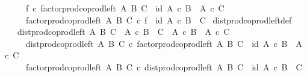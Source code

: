 \begin{isabellebody}
\ \ \ \ {\isasymand}\ f\ {\isasymcirc}\isactrlsub c\ factor{\isacharunderscore}{\kern0pt}prod{\isacharunderscore}{\kern0pt}coprod{\isacharunderscore}{\kern0pt}left\ A\ B\ C\ {\isacharequal}{\kern0pt}\ id\ {\isacharparenleft}{\kern0pt}{\isacharparenleft}{\kern0pt}A\ {\isasymtimes}\isactrlsub c\ B{\isacharparenright}{\kern0pt}\ {\isasymCoprod}\ {\isacharparenleft}{\kern0pt}A\ {\isasymtimes}\isactrlsub c\ C{\isacharparenright}{\kern0pt}{\isacharparenright}{\kern0pt}\isanewline
\ \ \ \ {\isasymand}\ factor{\isacharunderscore}{\kern0pt}prod{\isacharunderscore}{\kern0pt}coprod{\isacharunderscore}{\kern0pt}left\ A\ B\ C\ {\isasymcirc}\isactrlsub c\ f\ {\isacharequal}{\kern0pt}\ id\ {\isacharparenleft}{\kern0pt}A\ {\isasymtimes}\isactrlsub c\ {\isacharparenleft}{\kern0pt}B\ {\isasymCoprod}\ C{\isacharparenright}{\kern0pt}{\isacharparenright}{\kern0pt}{\isacharparenright}{\kern0pt}{\isachardoublequoteclose}\isanewline
\isanewline
{}\isamarkupfalse%
\ dist{\isacharunderscore}{\kern0pt}prod{\isacharunderscore}{\kern0pt}coprod{\isacharunderscore}{\kern0pt}left{\isacharunderscore}{\kern0pt}def{}{\isacharcolon}{\kern0pt}\isanewline
\ \ \ {\isachardoublequoteopen}dist{\isacharunderscore}{\kern0pt}prod{\isacharunderscore}{\kern0pt}coprod{\isacharunderscore}{\kern0pt}left\ A\ B\ C\ {\isacharcolon}{\kern0pt}\ A\ {\isasymtimes}\isactrlsub c\ {\isacharparenleft}{\kern0pt}B\ {\isasymCoprod}\ C{\isacharparenright}{\kern0pt}\ {\isasymrightarrow}\ {\isacharparenleft}{\kern0pt}A\ {\isasymtimes}\isactrlsub c\ B{\isacharparenright}{\kern0pt}\ {\isasymCoprod}\ {\isacharparenleft}{\kern0pt}A\ {\isasymtimes}\isactrlsub c\ C{\isacharparenright}{\kern0pt}\isanewline
\ \ \ \ {\isasymand}\ dist{\isacharunderscore}{\kern0pt}prod{\isacharunderscore}{\kern0pt}coprod{\isacharunderscore}{\kern0pt}left\ A\ B\ C\ {\isasymcirc}\isactrlsub c\ factor{\isacharunderscore}{\kern0pt}prod{\isacharunderscore}{\kern0pt}coprod{\isacharunderscore}{\kern0pt}left\ A\ B\ C\ {\isacharequal}{\kern0pt}\ id\ {\isacharparenleft}{\kern0pt}{\isacharparenleft}{\kern0pt}A\ {\isasymtimes}\isactrlsub c\ B{\isacharparenright}{\kern0pt}\ {\isasymCoprod}\ {\isacharparenleft}{\kern0pt}A\ {\isasymtimes}\isactrlsub c\ C{\isacharparenright}{\kern0pt}{\isacharparenright}{\kern0pt}\isanewline
\ \ \ \ {\isasymand}\ factor{\isacharunderscore}{\kern0pt}prod{\isacharunderscore}{\kern0pt}coprod{\isacharunderscore}{\kern0pt}left\ A\ B\ C\ {\isasymcirc}\isactrlsub c\ dist{\isacharunderscore}{\kern0pt}prod{\isacharunderscore}{\kern0pt}coprod{\isacharunderscore}{\kern0pt}left\ A\ B\ C\ {\isacharequal}{\kern0pt}\ id\ {\isacharparenleft}{\kern0pt}A\ {\isasymtimes}\isactrlsub c\ {\isacharparenleft}{\kern0pt}B\ {\isasymCoprod}\ C{\isacharparenright}{\kern0pt}{\isacharparenright}{\kern0pt}{\isachardoublequoteclose}\isanewline

\end{isabellebody}
